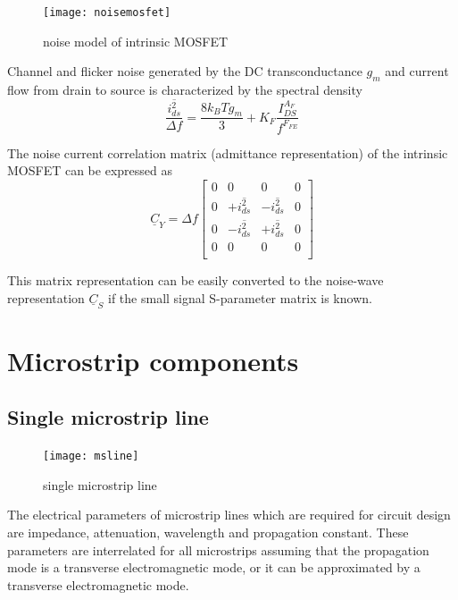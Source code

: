 \documentclass[10pt]{report}
\begin{document}
\begin{figure}[ht]
\begin{center}
\texttt{[image: noisemosfet]}
\end{center}
\caption{noise model of intrinsic MOSFET}
\label{fig:noisemosfet}
\end{figure}
\FloatBarrier

Channel and flicker noise generated by the DC transconductance $g_m$
and current flow from drain to source is characterized by the spectral
density
\begin{equation}
\dfrac{\overline{i_{ds}^2}}{\Delta f} = \dfrac{8 k_B T g_m}{3} + K_F\dfrac{I_{DS}^{A_F}}{f^{F_{FE}}}
\end{equation}

The noise current correlation matrix (admittance representation) of
the intrinsic MOSFET can be expressed as
\begin{equation}
\underline{C}_Y = \Delta f
\begin{bmatrix}
0 & 0 & 0 & 0\\
0 & +\overline{i_{ds}^2} & -\overline{i_{ds}^2} & 0\\
0 & -\overline{i_{ds}^2} & +\overline{i_{ds}^2} & 0\\
0 & 0 & 0 & 0\\
\end{bmatrix}
\end{equation}

This matrix representation can be easily converted to the noise-wave
representation $\underline{C}_S$ if the small signal S-parameter
matrix is known.

\chapter{Microstrip components}

\section{Single microstrip line}

\begin{figure}[ht]
\begin{center}
\texttt{[image: msline]}
\end{center}
\caption{single microstrip line}
\label{fig:MSline}
\end{figure}
\FloatBarrier

The electrical parameters of microstrip lines which are required for
circuit design are impedance, attenuation, wavelength and propagation
constant.  These parameters are interrelated for all microstrips
assuming that the propagation mode is a transverse electromagnetic
mode, or it can be approximated by a transverse electromagnetic mode.
\end{document}
